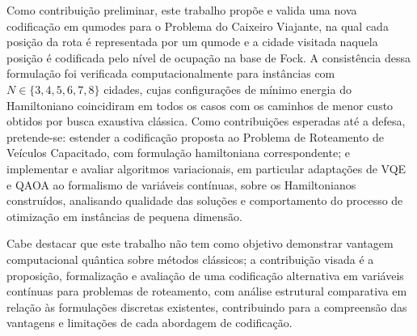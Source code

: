 Como contribuição preliminar, este trabalho propõe e valida uma nova codificação em qumodes para o Problema do Caixeiro Viajante, na qual cada posição da rota é representada por um qumode e a cidade visitada naquela posição é codificada pelo nível de ocupação na base de Fock. A consistência dessa formulação foi verificada computacionalmente para instâncias com $N\in\{3,4,5,6,7,8\}$ cidades, cujas configurações de mínimo energia do Hamiltoniano coincidiram em todos os casos com os caminhos de menor custo obtidos por busca exaustiva clássica. Como contribuições esperadas até a defesa, pretende-se: estender a codificação proposta ao Problema de Roteamento de Veículos Capacitado, com formulação hamiltoniana correspondente; e implementar e avaliar algoritmos variacionais, em particular adaptações de VQE e QAOA ao formalismo de variáveis contínuas, sobre os Hamiltonianos construídos, analisando qualidade das soluções e comportamento do processo de otimização em instâncias de pequena dimensão.

Cabe destacar que este trabalho não tem como objetivo demonstrar vantagem computacional quântica sobre métodos clássicos; a contribuição visada é a proposição, formalização e avaliação de uma codificação alternativa em variáveis contínuas para problemas de roteamento, com análise estrutural comparativa em relação às formulações discretas existentes, contribuindo para a compreensão das vantagens e limitações de cada abordagem de codificação.